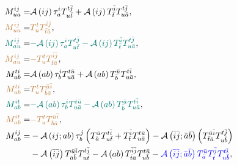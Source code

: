 \documentclass[a4paper,12pt,oneside]{book}
\newcommand{\blue}[1]{{\color{blue} #1}}
\newcommand{\brown}[1]{{\color{brown} #1}}
\newcommand{\green}[1]{{\color{pinegreen} #1}}
\newcommand{\asop}[1]{{\cal A}\left(#1\right)}
\newcommand{\ASop}[2]{{\cal A}\left(#1;#2\right)}
\newcommand{\spa}[1]{{#1}}
\newcommand{\spb}[1]{\bar{#1}}
\begin{document}
\begin{align}
M^{\spa{i}\spa{j}}_{\spa{u}\spa{a}} = &\asop{ij} \tau^{\spa{i}}_{\spa{a}} T^{\spa{t}\spb{j}}_{\spa{u}\spb{t}} 
                                       +\asop{ij} T^{\spb{i}}_{\spb{t}} T^{\spa{t}\spb{j}}_{\spa{u}\spb{a}}, \\
\brown{M^{\spa{i}\spa{j}}_{\spa{u}\spa{a}}} = &\brown{T^{\spa{t}}_{\spa{u}} T^{\spb{i}\spb{j}}_{\spb{t}\spb{a}}}, \\
\green{M^{\spa{i}\spa{j}}_{\spa{a}\spa{u}}} = &\green{-\asop{ij} \tau^{\spa{i}}_{\spa{a}} T^{\spa{t}\spb{j}}_{\spa{u}\spb{t}} 
                                       -\asop{ij} T^{\spb{i}}_{\spb{t}} T^{\spa{t}\spb{j}}_{\spa{u}\spb{a}}}, \\
\brown{M^{\spa{i}\spa{j}}_{\spa{a}\spa{u}}} = &\brown{-T^{\spa{t}}_{\spa{u}} T^{\spb{i}\spb{j}}_{\spb{t}\spb{a}}}, \\
M^{\spa{t}\spa{i}}_{\spa{a}\spa{b}} = &\asop{ab} \tau^{\spa{i}}_{\spa{b}} T^{\spa{t}\spb{u}}_{\spa{u}\spb{a}} 
                                      +\asop{ab} T^{\spb{u}}_{\spb{b}} T^{\spa{t}\spb{i}}_{\spa{u}\spb{a}} , \\
\brown{M^{\spa{t}\spa{i}}_{\spa{a}\spa{b}}} = &\brown{T^{\spa{t}}_{\spa{u}} T^{\spb{u}\spb{i}}_{\spb{b}\spb{a}}}, \\
\green{M^{\spa{i}\spa{t}}_{\spa{a}\spa{b}}} = &\green{-\asop{ab} \tau^{\spa{i}}_{\spa{b}} T^{\spa{t}\spb{u}}_{\spa{u}\spb{a}} 
                                      -\asop{ab} T^{\spb{u}}_{\spb{b}} T^{\spa{t}\spb{i}}_{\spa{u}\spb{a}}} , \\
\brown{M^{\spa{i}\spa{t}}_{\spa{a}\spa{b}}} = &\brown{-T^{\spa{t}}_{\spa{u}} T^{\spb{u}\spb{i}}_{\spb{b}\spb{a}}}, \\
M^{\spa{i}\spa{j}}_{\spa{a}\spa{b}} = &-\ASop{ij}{ab} \tau^{\spa{j}}_{\spa{b}} \left( T^{\spb{u}}_{\spb{a}} T^{\spa{t}\spb{i}}_{\spa{u}\spb{t}} 
                                       +T^{\spb{i}}_{\spb{t}} T^{\spa{t}\spb{u}}_{\spa{u}\spb{a}} \right)
                                       -\ASop{\spb{i}\spb{j}}{\spb{a}\spb{b}} \left( T^{\spb{u}\spb{i}}_{\spb{t}\spb{a}} T^{\spa{t}\spb{j}}_{\spa{u}\spb{b}} \right) \nonumber \\
                                      &-\asop{\spb{i}\spb{j}} T^{\spb{u}\spb{i}}_{\spb{a}\spb{b}} T^{\spa{t}\spb{j}}_{\spa{u}\spb{t}} 
                                       -\asop{ab} T^{\spb{i}\spb{j}}_{\spb{t}\spb{a}} T^{\spa{t}\spb{u}}_{\spa{u}\spb{b}}
                                       -\blue{\ASop{\spb{i}\spb{j}}{\spb{a}\spb{b}} T^{\spb{u}}_{\spb{a}} T^{\spb{j}}_{\spb{t}} T^{\spa{t}\spb{i}}_{\spa{u}\spb{b}}}, \\

\end{align}
\end{document}
